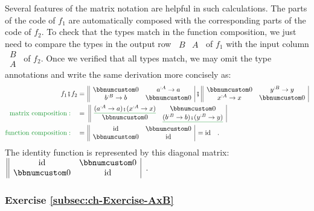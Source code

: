 Several features of the matrix notation are helpful in such calculations.
The parts of the code of $f_{1}$ are automatically composed with
the corresponding parts of the code of $f_{2}$. To check that the
types match in the function composition, we just need to compare the
types in the output row $\,\begin{array}{||cc|}
B & A\end{array}\,$ of $f_{1}$ with the input column $\,\begin{array}{|c||}
B\\
A
\end{array}\,$ of $f_{2}$. Once we verified that all types match, we may omit the
type annotations and write the same derivation more concisely as:
\begin{align*}
f_{1}\bef f_{2} & =\,\begin{array}{||cc|}
\bbnum 0 & a^{:A}\rightarrow a\\
b^{:B}\rightarrow b & \bbnum 0
\end{array}\,\bef\,\begin{array}{||cc|}
\bbnum 0 & y^{:B}\rightarrow y\\
x^{:A}\rightarrow x & \bbnum 0
\end{array}\\
{\color{greenunder}\text{matrix composition}:}\quad & =\,\,\begin{array}{||cc|}
\gunderline{(a^{:A}\rightarrow a)\bef(x^{:A}\rightarrow x)} & \bbnum 0\\
\bbnum 0 & \gunderline{(b^{:B}\rightarrow b)\bef(y^{:B}\rightarrow y)}
\end{array}\\
{\color{greenunder}\text{function composition}:}\quad & =\,\begin{array}{||cc|}
\text{id} & \bbnum 0\\
\bbnum 0 & \text{id}
\end{array}\,=\text{id}\quad.
\end{align*}
The identity function is represented by this diagonal matrix: $\,\begin{array}{||cc|}
\text{id} & \bbnum 0\\
\bbnum 0 & \text{id}
\end{array}$~.

\subsubsection{Exercise \label{subsec:ch-Exercise-AxB}\ref{subsec:ch-Exercise-AxB}}

